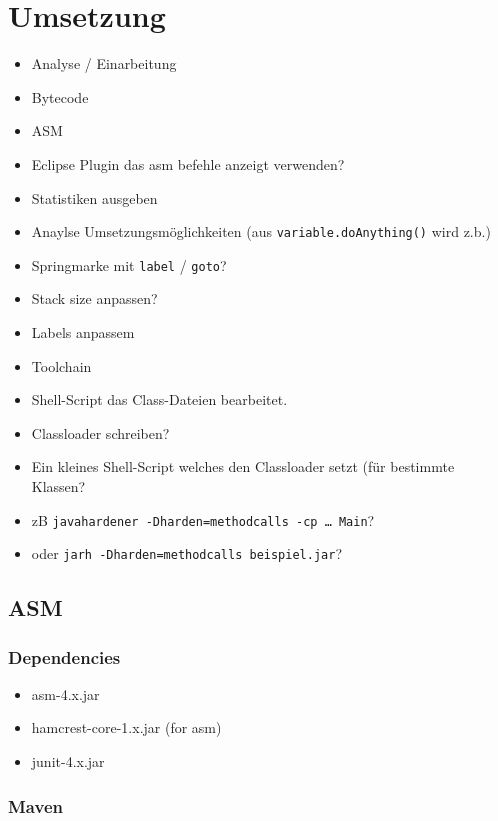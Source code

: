 
\chapter{Umsetzung}

\begin{itemize}
\item Analyse / Einarbeitung
\item Bytecode
\item ASM
\item Eclipse Plugin das asm befehle anzeigt verwenden?
\item Statistiken ausgeben
\item Anaylse Umsetzungsmöglichkeiten (aus \texttt{variable.doAnything()} wird z.b.)
\item Springmarke mit \texttt{label} / \texttt{goto}?
\item Stack size anpassen?
\item Labels anpassem
\item Toolchain
\item Shell-Script das Class-Dateien bearbeitet.
\item Classloader schreiben?
\item Ein kleines Shell-Script welches den Classloader setzt (für bestimmte Klassen?
\item zB \texttt{javahardener -Dharden=methodcalls -cp … Main}?
\item oder \texttt{jarh -Dharden=methodcalls beispiel.jar}?
\end{itemize}

\section{ASM}

\subsection{Dependencies}

\begin{itemize}
\item asm-4.x.jar
\item hamcrest-core-1.x.jar (for asm)
\item junit-4.x.jar
\end{itemize}

\subsection{Maven}


